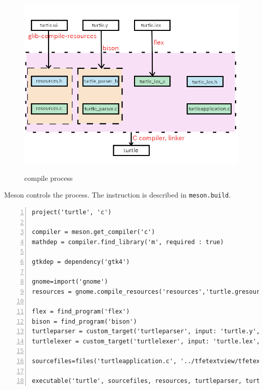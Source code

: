 \begin{figure}
\centering
\includegraphics[width=12cm,height=9cm]{../image/turtle_compile_process.png}
\caption{compile process}
\end{figure}

Meson controls the process. The instruction is described in
\passthrough{\lstinline!meson.build!}.

\begin{lstlisting}[numbers=left]
project('turtle', 'c')

compiler = meson.get_compiler('c')
mathdep = compiler.find_library('m', required : true)

gtkdep = dependency('gtk4')

gnome=import('gnome')
resources = gnome.compile_resources('resources','turtle.gresource.xml')

flex = find_program('flex')
bison = find_program('bison')
turtleparser = custom_target('turtleparser', input: 'turtle.y', output: ['turtle_parser.c', 'turtle_parser.h'], command: [bison, '-d', '-o', 'turtle_parser.c', '@INPUT@'])
turtlelexer = custom_target('turtlelexer', input: 'turtle.lex', output: 'turtle_lex.c', command: [flex, '-o', '@OUTPUT@', '@INPUT@'])

sourcefiles=files('turtleapplication.c', '../tfetextview/tfetextview.c')

executable('turtle', sourcefiles, resources, turtleparser, turtlelexer, turtleparser[1], dependencies: [mathdep, gtkdep], export_dynamic: true, install: true)
\end{lstlisting}

